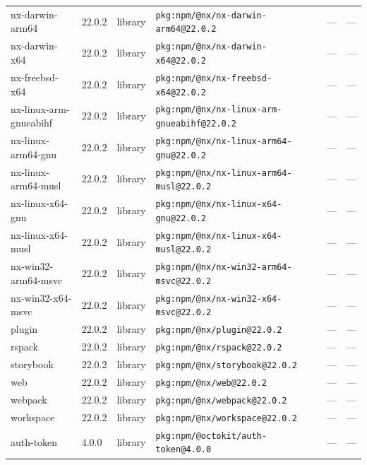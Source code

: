 \documentclass[11pt,a4paper]{article}
\begin{document}
\begin{longtable}{|p{4cm}|p{2cm}|p{1.6cm}|p{5cm}|p{1.5cm}|p{3.5cm}|}
\raggedright nx-darwin-arm64 & 22.0.2 & library & \small\texttt{pkg:npm/@nx/nx-darwin-arm64@22.0.2} & — & \small — \\
\raggedright nx-darwin-x64 & 22.0.2 & library & \small\texttt{pkg:npm/@nx/nx-darwin-x64@22.0.2} & — & \small — \\
\raggedright nx-freebsd-x64 & 22.0.2 & library & \small\texttt{pkg:npm/@nx/nx-freebsd-x64@22.0.2} & — & \small — \\
\raggedright nx-linux-arm-gnueabihf & 22.0.2 & library & \small\texttt{pkg:npm/@nx/nx-linux-arm-gnueabihf@22.0.2} & — & \small — \\
\raggedright nx-linux-arm64-gnu & 22.0.2 & library & \small\texttt{pkg:npm/@nx/nx-linux-arm64-gnu@22.0.2} & — & \small — \\
\raggedright nx-linux-arm64-musl & 22.0.2 & library & \small\texttt{pkg:npm/@nx/nx-linux-arm64-musl@22.0.2} & — & \small — \\
\raggedright nx-linux-x64-gnu & 22.0.2 & library & \small\texttt{pkg:npm/@nx/nx-linux-x64-gnu@22.0.2} & — & \small — \\
\raggedright nx-linux-x64-musl & 22.0.2 & library & \small\texttt{pkg:npm/@nx/nx-linux-x64-musl@22.0.2} & — & \small — \\
\raggedright nx-win32-arm64-msvc & 22.0.2 & library & \small\texttt{pkg:npm/@nx/nx-win32-arm64-msvc@22.0.2} & — & \small — \\
\raggedright nx-win32-x64-msvc & 22.0.2 & library & \small\texttt{pkg:npm/@nx/nx-win32-x64-msvc@22.0.2} & — & \small — \\
\raggedright plugin & 22.0.2 & library & \small\texttt{pkg:npm/@nx/plugin@22.0.2} & — & \small — \\
\raggedright rspack & 22.0.2 & library & \small\texttt{pkg:npm/@nx/rspack@22.0.2} & — & \small — \\
\raggedright storybook & 22.0.2 & library & \small\texttt{pkg:npm/@nx/storybook@22.0.2} & — & \small — \\
\raggedright web & 22.0.2 & library & \small\texttt{pkg:npm/@nx/web@22.0.2} & — & \small — \\
\raggedright webpack & 22.0.2 & library & \small\texttt{pkg:npm/@nx/webpack@22.0.2} & — & \small — \\
\raggedright workspace & 22.0.2 & library & \small\texttt{pkg:npm/@nx/workspace@22.0.2} & — & \small — \\
\raggedright auth-token & 4.0.0 & library & \small\texttt{pkg:npm/@octokit/auth-token@4.0.0} & — & \small — \\

\end{longtable}
\end{document}
